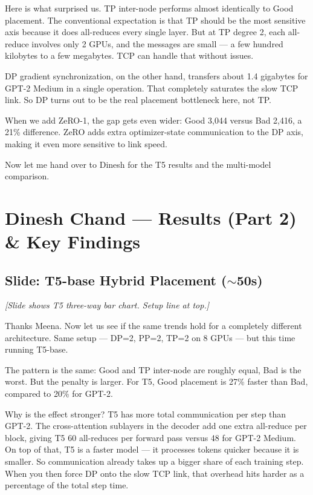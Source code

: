\documentclass[11pt, a4paper]{article}
\begin{document}
Here is what surprised us. TP inter-node performs almost identically to Good placement. The conventional expectation is that TP should be the most sensitive axis because it does all-reduces every single layer. But at TP degree 2, each all-reduce involves only 2 GPUs, and the messages are small --- a few hundred kilobytes to a few megabytes. TCP can handle that without issues.

DP gradient synchronization, on the other hand, transfers about 1.4 gigabytes for GPT-2 Medium in a single operation. That completely saturates the slow TCP link. So DP turns out to be the real placement bottleneck here, not TP.

When we add ZeRO-1, the gap gets even wider: Good 3,044 versus Bad 2,416, a 21\% difference. ZeRO adds extra optimizer-state communication to the DP axis, making it even more sensitive to link speed.

Now let me hand over to Dinesh for the T5 results and the multi-model comparison.

\section{Dinesh Chand --- Results (Part 2) \& Key Findings}

\subsection{Slide: T5-base Hybrid Placement ($\sim$50s)}
\textit{[Slide shows T5 three-way bar chart. Setup line at top.]}

Thanks Meena. Now let us see if the same trends hold for a completely different architecture. Same setup --- DP=2, PP=2, TP=2 on 8 GPUs --- but this time running T5-base.

The pattern is the same: Good and TP inter-node are roughly equal, Bad is the worst. But the penalty is larger. For T5, Good placement is 27\% faster than Bad, compared to 20\% for GPT-2.

Why is the effect stronger? T5 has more total communication per step than GPT-2. The cross-attention sublayers in the decoder add one extra all-reduce per block, giving T5 60 all-reduces per forward pass versus 48 for GPT-2 Medium. On top of that, T5 is a faster model --- it processes tokens quicker because it is smaller. So communication already takes up a bigger share of each training step. When you then force DP onto the slow TCP link, that overhead hits harder as a percentage of the total step time.
\end{document}
